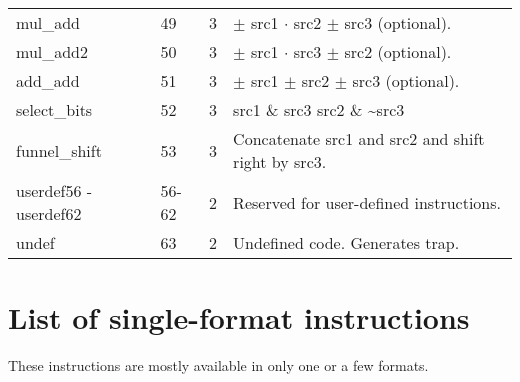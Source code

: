 \documentclass[forwardcom.tex]{subfiles}
\begin{document}
\begin{longtable} {|p{25mm}|p{12mm}|p{12mm}|p{100mm}|}
mul\_add     & 49 & 3 & $\pm$ src1 $\cdot$ src2 $\pm$ src3 (optional). \\
mul\_add2    & 50 & 3 & $\pm$ src1 $\cdot$ src3 $\pm$ src2 (optional). \\
add\_add     & 51 & 3 & $\pm$ src1 $\pm$ src2 $\pm$ src3 (optional). \\
select\_bits & 52 & 3 & src1 \& src3 \textbar{} src2 \& \~{}src3 \\
funnel\_shift & 53 & 3 & Concatenate src1 and src2 and shift right by src3. \\
userdef56 - userdef62
             & 56-62 & 2 & Reserved for user-defined instructions. \\
undef        & 63 & 2 & Undefined code. Generates trap. \\
\hline
\end{longtable}


\section{List of single-format instructions}
These instructions are mostly available in only one or a few formats.
\end{document}
